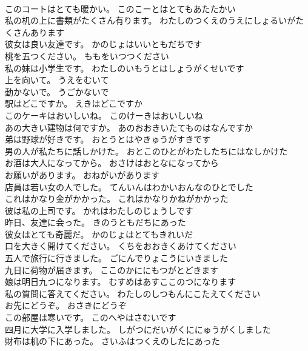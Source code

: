 \documentclass[8pt]{extreport}
\begin{document}
\begin{CJK}{UTF8}{min}
\\	このコートはとても暖かい。	このこーとはとてもあたたかい 
\\	私の机の上に書類がたくさん有ります。	わたしのつくえのうえにしょるいがたくさんあります 
\\	彼女は良い友達です。	かのじょはいいともだちです 
\\	桃を五つください。	ももをいつつください 
\\	私の妹は小学生です。	わたしのいもうとはしょうがくせいです 
\\	上を向いて。	うえをむいて 
\\	動かないで。	うごかないで 
\\	駅はどこですか。	えきはどこですか 
\\	このケーキはおいしいね。	このけーきはおいしいね 
\\	あの大きい建物は何ですか。	あのおおきいたてものはなんですか 
\\	弟は野球が好きです。	おとうとはやきゅうがすきです 
\\	男の人が私たちに話しかけた。	おとこのひとがわたしたちにはなしかけた 
\\	お酒は大人になってから。	おさけはおとなになってから 
\\	お願いがあります。	おねがいがあります 
\\	店員は若い女の人でした。	てんいんはわかいおんなのひとでした 
\\	これはかなり金がかかった。	これはかなりかねがかかった 
\\	彼は私の上司です。	かれはわたしのじょうしです 
\\	昨日、友達に会った。	きのうともだちにあった 
\\	彼女はとても奇麗だ。	かのじょはとてもきれいだ 
\\	口を大きく開けてください。	くちをおおきくあけてください 
\\	五人で旅行に行きました。	ごにんでりょこうにいきました 
\\	九日に荷物が届きます。	ここのかににもつがとどきます 
\\	娘は明日九つになります。	むすめはあすここのつになります 
\\	私の質問に答えてください。	わたしのしつもんにこたえてください 
\\	お先にどうぞ。	おさきにどうぞ 
\\	この部屋は寒いです。	このへやはさむいです 
\\	四月に大学に入学しました。	しがつにだいがくににゅうがくしました 
\\	財布は机の下にあった。	さいふはつくえのしたにあった 

\end{CJK}
\end{document}
